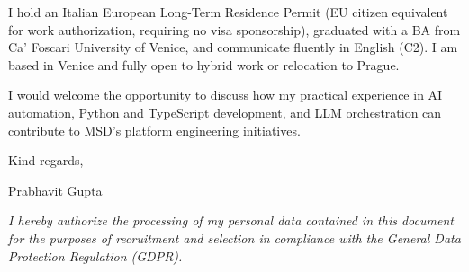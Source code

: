 \documentclass[11pt,a4paper]{article}
\begin{document}
I hold an Italian European Long-Term Residence Permit (EU citizen equivalent for work authorization, requiring no visa sponsorship), graduated with a BA from Ca' Foscari University of Venice, and communicate fluently in English (C2). I am based in Venice and fully open to hybrid work or relocation to Prague.

I would welcome the opportunity to discuss how my practical experience in AI automation, Python and TypeScript development, and LLM orchestration can contribute to MSD's platform engineering initiatives.

Kind regards,

Prabhavit Gupta

\vspace{1.5em}
{\footnotesize \textit{I hereby authorize the processing of my personal data contained in this document for the purposes of recruitment and selection in compliance with the General Data Protection Regulation (GDPR).}\par}
\end{document}
